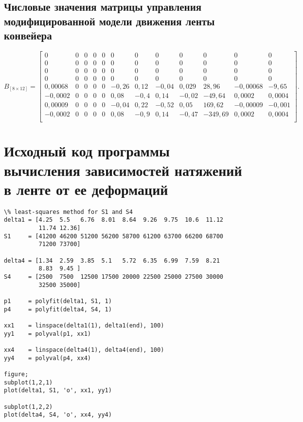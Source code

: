 \section{Числовые значения матрицы управления модифицированной модели движения ленты конвейера}\label{Appendix15}

$
B_{[8 \times 12]} = 
\begin{bmatrix}
 0       & 0 & 0 & 0 & 0 & 0     & 0    & 0     & 0     & 0       & 0        & 0      \\
 0       & 0 & 0 & 0 & 0 & 0     & 0    & 0     & 0     & 0       & 0        & 0      \\
 0       & 0 & 0 & 0 & 0 & 0     & 0    & 0     & 0     & 0       & 0        & 0      \\
 0       & 0 & 0 & 0 & 0 & 0     & 0    & 0     & 0     & 0       & 0        & 0      \\
 0,00068 & 0 & 0 & 0 & 0 & -0,26 & 0,12 & -0,04 & 0,029 & 28,96   & -0,00068 & -9,65  \\
 -0,0002 & 0 & 0 & 0 & 0 & 0,08  & -0,4 & 0,14  & -0,02 & -49,64  & 0,0002   & 0,0004 \\
 0,00009 & 0 & 0 & 0 & 0 & -0,04 & 0,22 & -0,52 & 0,05  & 169,62  & -0,00009 & -0,001 \\
 -0,0002 & 0 & 0 & 0 & 0 & 0,08  & -0,9 & 0,14  & -0,47 & -349,69 & 0,0002   & 0,0004 \\
\end{bmatrix}.
$

\chapter{Исходный код программы вычисления зависимостей натяжений в ленте от ее деформаций} \label{AppendixLSM} 
\begin{verbatim}
\% least-squares method for S1 and S4
delta1 = [4.25  5.5   6.76  8.01  8.64  9.26  9.75  10.6  11.12
          11.74 12.36]
S1     = [41200 46200 51200 56200 58700 61200 63700 66200 68700 
          71200 73700]

delta4 = [1.34  2.59  3.85  5.1   5.72  6.35  6.99  7.59  8.21 
          8.83  9.45 ]
S4     = [2500  7500  12500 17500 20000 22500 25000 27500 30000 
          32500 35000]

p1     = polyfit(delta1, S1, 1)
p4     = polyfit(delta4, S4, 1)

xx1    = linspace(delta1(1), delta1(end), 100)
yy1    = polyval(p1, xx1)

xx4    = linspace(delta4(1), delta4(end), 100)
yy4    = polyval(p4, xx4)

figure;
subplot(1,2,1)
plot(delta1, S1, 'o', xx1, yy1)

subplot(1,2,2)
plot(delta4, S4, 'o', xx4, yy4)
\end{verbatim}

